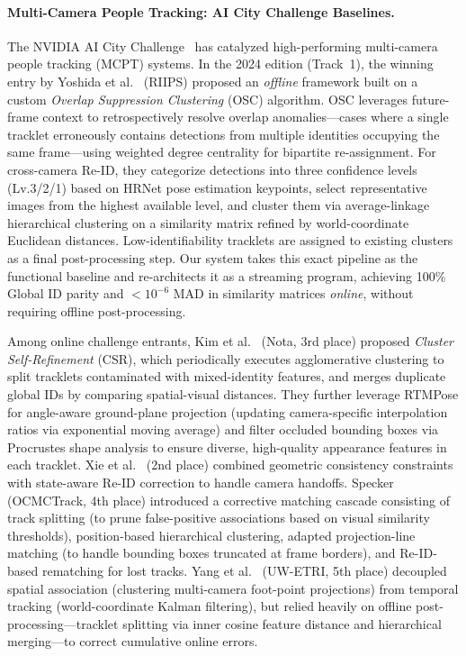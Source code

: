 \documentclass[review]{elsarticle}
\begin{document}
\paragraph{Multi-Camera People Tracking: AI City Challenge Baselines.}
The NVIDIA AI City Challenge~\cite{wang2024aicity} has catalyzed high-performing multi-camera people tracking (MCPT) systems. In the 2024 edition (Track~1), the winning entry by Yoshida et al.~\cite{yoshida2024overlap} (RIIPS) proposed an \emph{offline} framework built on a custom \emph{Overlap Suppression Clustering} (OSC) algorithm. OSC leverages future-frame context to retrospectively resolve overlap anomalies---cases where a single tracklet erroneously contains detections from multiple identities occupying the same frame---using weighted degree centrality for bipartite re-assignment. For cross-camera Re-ID, they categorize detections into three confidence levels (Lv.3/2/1) based on HRNet pose estimation keypoints, select representative images from the highest available level, and cluster them via average-linkage hierarchical clustering on a similarity matrix refined by world-coordinate Euclidean distances. Low-identifiability tracklets are assigned to existing clusters as a final post-processing step. Our system takes this exact pipeline as the functional baseline and re-architects it as a streaming program, achieving 100\% Global ID parity and $<10^{-6}$ MAD in similarity matrices \emph{online}, without requiring offline post-processing.

Among online challenge entrants, Kim et al.~\cite{kim2024cluster} (Nota, 3rd place) proposed \emph{Cluster Self-Refinement} (CSR), which periodically executes agglomerative clustering to split tracklets contaminated with mixed-identity features, and merges duplicate global IDs by comparing spatial-visual distances. They further leverage RTMPose for angle-aware ground-plane projection (updating camera-specific interpolation ratios via exponential moving average) and filter occluded bounding boxes via Procrustes shape analysis to ensure diverse, high-quality appearance features in each tracklet. Xie et al.~\cite{xie2024robust} (2nd place) combined geometric consistency constraints with state-aware Re-ID correction to handle camera handoffs. Specker~\cite{specker2024ocmctrack} (OCMCTrack, 4th place) introduced a corrective matching cascade consisting of track splitting (to prune false-positive associations based on visual similarity thresholds), position-based hierarchical clustering, adapted projection-line matching (to handle bounding boxes truncated at frame borders), and Re-ID-based rematching for lost tracks. Yang et al.~\cite{yang2024online} (UW-ETRI, 5th place) decoupled spatial association (clustering multi-camera foot-point projections) from temporal tracking (world-coordinate Kalman filtering), but relied heavily on offline post-processing---tracklet splitting via inner cosine feature distance and hierarchical merging---to correct cumulative online errors.
\end{document}
